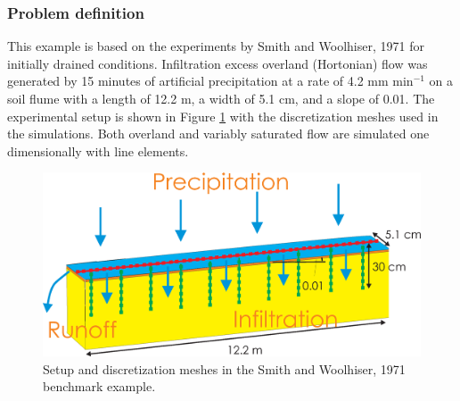 \subsubsection*{Problem definition}
%
This example is based on the experiments by Smith and Woolhiser, 1971 \cite{Smith:71} for initially drained conditions.
%
Infiltration excess overland (Hortonian) flow was generated by 15 minutes of artificial precipitation at a rate of 4.2 mm min$^{-1}$ on a soil flume
with a length of 12.2 m, a width of 5.1 cm, and a slope of 0.01. The experimental setup
is shown in Figure \ref{coup:woolhiserSetup} with the discretization meshes used in the simulations. Both overland and variably saturated flow are simulated one dimensionally with line elements.
%
\begin{figure} [htb!]
 \centering
 \includegraphics[width=0.75\columnwidth] {H_COUP/figures/woolhiserSetup.eps}
 \caption{Setup and discretization meshes in the Smith and Woolhiser, 1971 \cite{Smith:71} benchmark example.}
 \label{coup:woolhiserSetup}
\end{figure}
%
